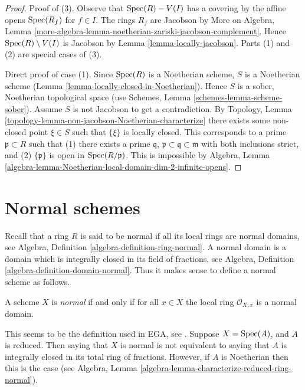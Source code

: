 \begin{proof}
Proof of (3). Observe that $\mathop{\mathrm{Spec}}(R) - V(I)$ has a covering by the affine
opens $\mathop{\mathrm{Spec}}(R_f)$ for $f \in I$. The rings $R_f$ are Jacobson by
More on Algebra, Lemma
\ref{more-algebra-lemma-noetherian-zariski-jacobson-complement}.
Hence $\mathop{\mathrm{Spec}}(R) \setminus V(I)$ is Jacobson by
Lemma \ref{lemma-locally-jacobson}.
Parts (1) and (2) are special cases of (3).

\medskip\noindent
Direct proof of case (1).
Since $\mathop{\mathrm{Spec}}(R)$ is a Noetherian scheme,
$S$ is a Noetherian scheme (Lemma \ref{lemma-locally-closed-in-Noetherian}).
Hence $S$ is a sober, Noetherian topological space (use
Schemes, Lemma \ref{schemes-lemma-scheme-sober}).
Assume $S$ is not Jacobson to
get a contradiction. By
Topology, Lemma \ref{topology-lemma-non-jacobson-Noetherian-characterize}
there exists some non-closed point $\xi \in S$
such that $\{\xi\}$ is locally closed. This corresponds
to a prime $\mathfrak p \subset R$ such that (1) there exists
a prime $\mathfrak q$, $\mathfrak p \subset \mathfrak q \subset \mathfrak m$
with both inclusions strict, and (2) $\{\mathfrak p\}$ is open in
$\mathop{\mathrm{Spec}}(R/\mathfrak p)$. This is impossible by Algebra,
Lemma \ref{algebra-lemma-Noetherian-local-domain-dim-2-infinite-opens}.
\end{proof}







\section{Normal schemes}
\label{section-normal}

\noindent
Recall that a ring $R$ is said to be normal if all its local rings
are normal domains,
see Algebra, Definition \ref{algebra-definition-ring-normal}.
A normal domain is a domain which is integrally closed in its field
of fractions, see
Algebra, Definition \ref{algebra-definition-domain-normal}.
Thus it makes sense to define a normal scheme as follows.

\begin{definition}
\label{definition-normal}
A scheme $X$ is {\it normal} if and only if for all $x \in X$ the local ring
$\mathcal{O}_{X, x}$ is a normal domain.
\end{definition}

\noindent
This seems to be the definition used in EGA, see \cite[0, 4.1.4]{EGA}.
Suppose $X = \mathop{\mathrm{Spec}}(A)$, and $A$ is reduced. Then saying that $X$ is
normal is not equivalent to saying that $A$ is integrally closed in its
total ring of fractions. However, if $A$ is Noetherian then this is the case
(see Algebra, Lemma \ref{algebra-lemma-characterize-reduced-ring-normal}).

